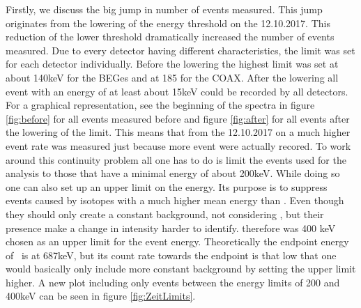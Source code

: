 \documentclass[encoding=utf8,british]{tumphthesis}
\begin{document}
Firstly, we discuss the big jump in number of events measured.
This jump originates from the lowering of the energy threshold on the 12.10.2017.
This reduction of the lower threshold dramatically increased the number of events measured.
Due to every detector having different characteristics, the limit was set for each detector individually.
Before the lowering the highest limit was set at about 140keV for the BEGes and at 185 for the COAX.
After the lowering all event with an energy of at least about 15keV could be recorded by all detectors.
For a graphical representation, see the beginning of the spectra in figure \ref{fig:before} for all events measured before and figure \ref{fig:after} for all events after the lowering of the limit. 
This means that from the 12.10.2017 on a much higher event rate was measured just because more event were actually recored.
To work around this continuity problem all one has to do is limit the events used for the analysis to those that have a minimal energy of about 200keV. 
While doing so one can also set up an upper limit on the energy.
Its purpose is to suppress events caused by isotopes with a much higher  mean energy than \Kr.
Even though they should only create a constant background, not considering , but their presence make a change in intensity harder to identify.
therefore was 400 keV chosen as an upper limit for the event energy.
Theoretically the endpoint energy of \Kr\ is at 687keV, but its count rate towards the endpoint is that low that one would basically only include more constant background by setting the upper limit higher.
A new plot including only events between the energy limits of 200 and 400keV can be seen in figure \ref{fig:ZeitLimits}.
\\
\end{document}
